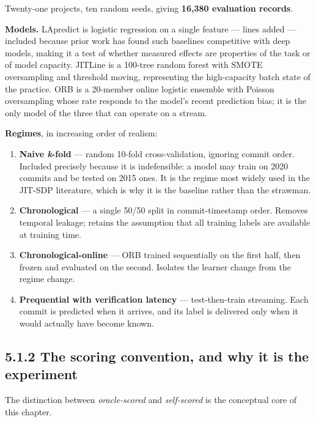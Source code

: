 Twenty-one projects, ten random seeds, giving \textbf{16,380 evaluation
records}.

\textbf{Models.} LApredict is logistic regression on a single feature
--- lines added --- included because prior work has found such baselines
competitive with deep models, making it a test of whether measured
effects are properties of the task or of model capacity. JITLine is a
100-tree random forest with SMOTE oversampling and threshold moving,
representing the high-capacity batch state of the practice. ORB is a
20-member online logistic ensemble with Poisson oversampling whose rate
responds to the model's recent prediction bias; it is the only model of
the three that can operate on a stream.

\textbf{Regimes}, in increasing order of realism:

\begin{enumerate}
\def\labelenumi{\arabic{enumi}.}
\tightlist
\item
  \textbf{Naive \emph{k}-fold} --- random 10-fold cross-validation,
  ignoring commit order. Included precisely because it is indefensible:
  a model may train on 2020 commits and be tested on 2015 ones. It is
  the regime most widely used in the JIT-SDP literature, which is why it
  is the baseline rather than the strawman.
\item
  \textbf{Chronological} --- a single 50/50 split in commit-timestamp
  order. Removes temporal leakage; retains the assumption that all
  training labels are available at training time.
\item
  \textbf{Chronological-online} --- ORB trained sequentially on the
  first half, then frozen and evaluated on the second. Isolates the
  learner change from the regime change.
\item
  \textbf{Prequential with verification latency} --- test-then-train
  streaming. Each commit is predicted when it arrives, and its label is
  delivered only when it would actually have become known.
\end{enumerate}

\subsection{5.1.2 The scoring convention, and why it is the
experiment}\label{the-scoring-convention-and-why-it-is-the-experiment}

The distinction between \emph{oracle-scored} and \emph{self-scored} is
the conceptual core of this chapter.

